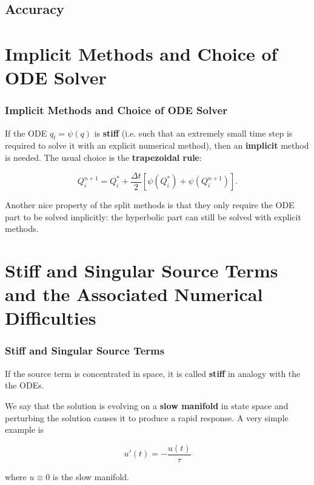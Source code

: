 \documentclass{beamer}
\renewcommand{\d}{\Delta}
\newcommand{\emp}[1]{\textcolor{tum}{\textbf{#1}}}
\begin{document}
\subsection{Accuracy}
















\section{Implicit Methods and Choice of ODE Solver}

\begin{frame}
	\frametitle{Implicit Methods and Choice of ODE Solver}
	If the ODE $q_t=\psi(q)$ is \emp{stiff} (i.e. such that an extremely small time step is required to solve it with an explicit numerical method), then an \emp{implicit} method is needed. The usual choice is the \emp{trapezoidal rule}:

	\begin{equation}\label{eq:trapezoidal}
		Q_i^{n+1} = Q_i^*+\frac{\d t}{2}[\psi(Q_i^*)+\psi(Q_i^{n+1})].
	\end{equation}

	Another nice property of the split methods is that they only require the ODE part to be solved implicitly: the hyperbolic part can still be solved with explicit methods.
\end{frame}













\section{Stiff and Singular Source Terms and the Associated Numerical Difficulties}

\begin{frame}
	\frametitle{Stiff and Singular Source Terms}

	If the source term is concentrated in space, it is called \emp{stiff} in analogy with the the ODEs.

	We say that the solution is evolving on a \emp{slow manifold} in state space and perturbing the solution causes it to produce a rapid response. A very simple example is

	\begin{equation}\label{eq:stiff}
		u'(t)=-\frac{u(t)}{\tau}
	\end{equation}

	where $u\equiv0$ is the slow manifold.
\end{frame}
\end{document}
